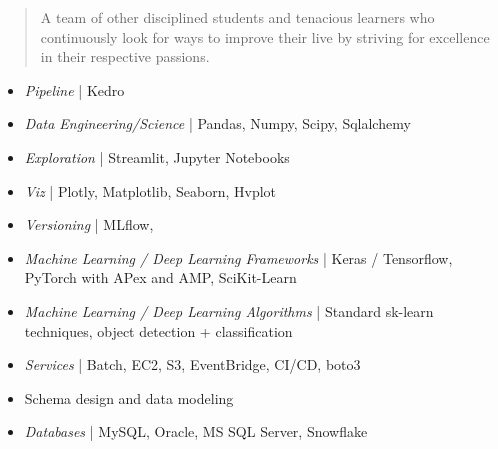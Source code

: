 \documentclass[10pt,a4paper,ragged2e,withhyper]{altacv}
\begin{document}
\begin{paracol}{2}
\switchcolumn


\begin{quote}
\justify
A team of other disciplined students and tenacious learners who continuously look for ways to improve their live by striving for excellence in their respective passions.
\end{quote}



\begin{itemize}
\item \textit{{\faStream} Pipeline} | Kedro 
\item \textit{{\faAtom} Data Engineering/Science} | Pandas, Numpy, Scipy, Sqlalchemy
\item \textit{{\faEye} Exploration} | Streamlit, Jupyter Notebooks
\item \textit{{\faChartPie} Viz} | Plotly, Matplotlib, Seaborn, Hvplot
\item \textit{{\faCodeBranch} Versioning} | MLflow, \faGit

\item \textit{{\faProjectDiagram} Machine Learning / Deep Learning Frameworks} | Keras / Tensorflow, PyTorch with APex and AMP, SciKit-Learn
\item \textit{{\faBrain} Machine Learning / Deep Learning Algorithms} | Standard sk-learn techniques, object detection + classification 

\end{itemize}


\begin{itemize}

\item \textit{{\faStream} Services} | Batch, EC2, S3, EventBridge, CI/CD, boto3

\end{itemize}

\begin{itemize}
\item Schema design and data modeling
\item \textit{Databases} | MySQL, Oracle, MS SQL Server, Snowflake
\end{itemize}


\end{paracol}
\end{document}
